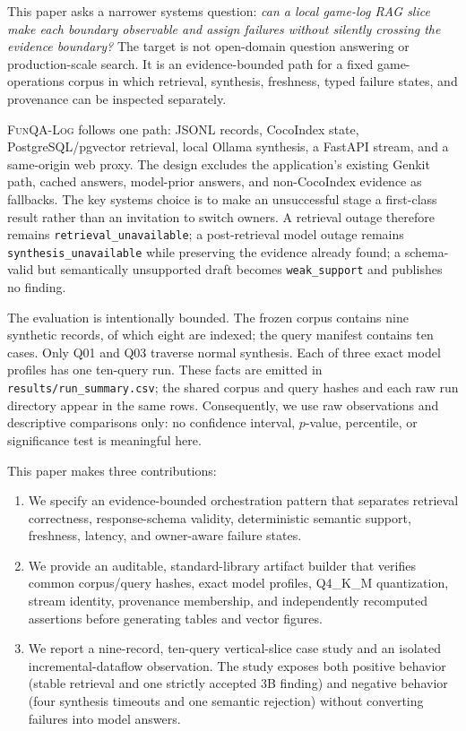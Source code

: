 \documentclass[10pt,twocolumn]{article}
\newcommand{\system}{\textsc{FunQA-Log}}
\newcommand{\code}[1]{\texttt{#1}}
\DeclareRobustCommand{\rawpath}[1]{\nolinkurl{#1}}
\begin{document}
This paper asks a narrower systems question: \emph{can a local game-log RAG slice make each boundary observable and assign failures without silently crossing the evidence boundary?}  The target is not open-domain question answering or production-scale search.  It is an evidence-bounded path for a fixed game-operations corpus in which retrieval, synthesis, freshness, typed failure states, and provenance can be inspected separately.

\system{} follows one path: JSONL records, CocoIndex state, PostgreSQL/pgvector retrieval, local Ollama synthesis, a FastAPI stream, and a same-origin web proxy.  The design excludes the application's existing Genkit path, cached answers, model-prior answers, and non-CocoIndex evidence as fallbacks.  The key systems choice is to make an unsuccessful stage a first-class result rather than an invitation to switch owners.  A retrieval outage therefore remains \code{retrieval\_unavailable}; a post-retrieval model outage remains \code{synthesis\_unavailable} while preserving the evidence already found; a schema-valid but semantically unsupported draft becomes \code{weak\_support} and publishes no finding.

The evaluation is intentionally bounded.  The frozen corpus contains nine synthetic records, of which eight are indexed; the query manifest contains ten cases.  Only Q01 and Q03 traverse normal synthesis.  Each of three exact model profiles has one ten-query run.  These facts are emitted in \rawpath{results/run_summary.csv}; the shared corpus and query hashes and each raw run directory appear in the same rows.  Consequently, we use raw observations and descriptive comparisons only: no confidence interval, $p$-value, percentile, or significance test is meaningful here.

This paper makes three contributions:
\begin{enumerate}
  \item We specify an evidence-bounded orchestration pattern that separates retrieval correctness, response-schema validity, deterministic semantic support, freshness, latency, and owner-aware failure states.
  \item We provide an auditable, standard-library artifact builder that verifies common corpus/query hashes, exact model profiles, Q4\_K\_M quantization, stream identity, provenance membership, and independently recomputed assertions before generating tables and vector figures.
  \item We report a nine-record, ten-query vertical-slice case study and an isolated incremental-dataflow observation.  The study exposes both positive behavior (stable retrieval and one strictly accepted 3B finding) and negative behavior (four synthesis timeouts and one semantic rejection) without converting failures into model answers.
\end{enumerate}
\end{document}
